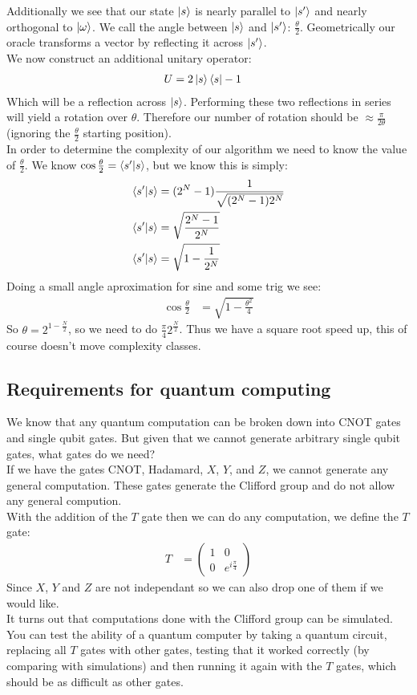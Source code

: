 Additionally we see that our state $\ket{s}$ is nearly parallel to $\ket{s'}$ and nearly orthogonal to $\ket{\omega}$. We call the angle between $\ket{s}$ and $\ket{s'}$: $\frac{\theta}{2}$. Geometrically our oracle transforms a vector by reflecting it across $\ket{s'}$.\\
We now construct an additional unitary operator:
\begin{align*}
	U &= 2\ket{s}\bra{s} - 1
\end{align*}
Which will be a reflection across $\ket{s}$. Performing these two reflections in series will yield a rotation over $\theta$. Therefore our number of rotation should be $\approx \frac{\pi}{2\theta}$ (ignoring the $\frac{\theta}{2}$ starting position). \\
In order to determine the complexity of our algorithm we need to know the value of $\frac{\theta}{2}$. We know $\cos\frac{\theta}{2} = \bra{s'}\ket{s}$, but we know this is simply:
\begin{align*}
	\bra{s'}\ket{s} &= (2^N -1)\frac{1}{\sqrt{(2^N-1)2^N}} \\
	\bra{s'}\ket{s} &= \sqrt{\frac{2^N-1}{2^N}} \\
	\bra{s'}\ket{s} &= \sqrt{1- \frac{1}{2^N}}
\end{align*}
Doing a small angle aproximation for sine and some trig we see:
\begin{align*}
	\cos\frac{\theta}{2} &= \sqrt{1-\frac{\theta^2}{4}}
\end{align*}
So $\theta = 2^{1 -\frac{N}{2}}$, so we need to do $\frac{\pi}{4} 2^\frac{N}{2}$. Thus we have a square root speed up, this of course doesn't move complexity classes.
\subsection{Requirements for quantum computing}
We know that any quantum computation can be broken down into CNOT gates and single qubit gates. But given that we cannot generate arbitrary single qubit gates, what gates do we need?\\
If we have the gates CNOT, Hadamard, $X$, $Y$, and $Z$, we cannot generate any general computation. These gates generate the Clifford group and do not allow any general compution.\\
With the addition of the $T$ gate then we can do any computation, we define the $T$ gate:
\begin{align*}
	T &= \begin{pmatrix}
		1 & 0 \\
		0 & e^{i\frac{\pi}{4}}
      \end{pmatrix}
\end{align*}
Since $X$, $Y$ and $Z$ are not independant so we can also drop one of them if we would like. \\
It turns out that computations done with the Clifford group can be simulated. \\
You can test the ability of a quantum computer by taking a quantum circuit, replacing all $T$ gates with other gates, testing that it worked correctly (by comparing with simulations) and then running it again with the $T$ gates, which should be as difficult as other gates. \\
